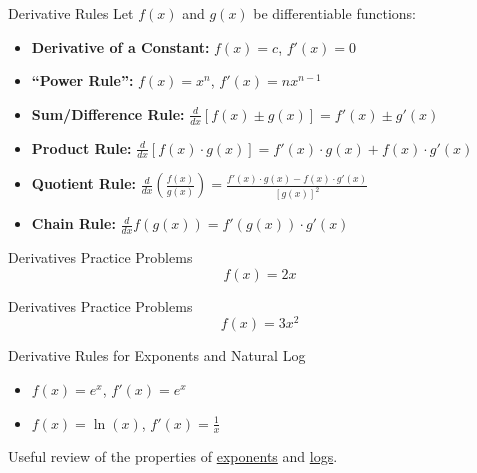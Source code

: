 \documentclass[aspectratio=169]{beamer}
\begin{document}
\begin{frame}{Derivative Rules}\label{main1}
Let \(f(x)\) and \(g(x)\) be differentiable functions:
\begin{itemize}
    \item \textbf{Derivative of a Constant:} \(f(x) = c\), \(f'(x) = 0\)
    \item \textbf{“Power Rule”:} \(f(x) = x^n\), \(f'(x) = nx^{n-1}\) 
    \item \textbf{Sum/Difference Rule:} \quad $\frac{d}{dx} [f(x) \pm g(x)] = f'(x) \pm g'(x)$
    \item \textbf{Product Rule:} \quad $\frac{d}{dx} [f(x) \cdot g(x)] = f'(x) \cdot g(x) + f(x) \cdot g'(x)$
    \item \textbf{Quotient Rule:} \quad $\frac{d}{dx} \left( \frac{f(x)}{g(x)} \right) = \frac{f'(x) \cdot g(x) - f(x) \cdot g'(x)}{[g(x)]^2}$
    \item \textbf{Chain Rule:} \quad $\frac{d}{dx} f(g(x)) = f'(g(x)) \cdot g'(x)$
\end{itemize}
\end{frame}

\begin{frame}{Derivatives Practice Problems}\label{main1}
	\vspace{-4cm}
     \[
    f(x) = 2x
    \]
\end{frame}

\begin{frame}{Derivatives Practice Problems}\label{main1}
	\vspace{-4cm}
     \[
    f(x) = 3x^2
    \]
\end{frame}

\begin{frame}{Derivative Rules for Exponents and Natural Log}\label{main1}
\begin{itemize}
\begin{itemize}
    \item \(f(x) = e^x\), \(f'(x) = e^x\)
    \item \(f(x) = \ln(x)\), \(f'(x) = \frac{1}{x}\)
\end{itemize}
\end{itemize}
\bigskip
Useful review of the properties of \hyperlink{exponentslide}{exponents} and \hyperlink{naturallogslide}{logs}.
\end{frame}
\end{document}
